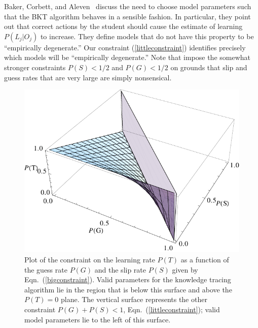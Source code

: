 \documentclass{acmlarge-edm}
\begin{document}
Baker, Corbett, and Aleven~\citeyear{baker_more_2008} discuss the need
to choose model parameters such that the BKT algorithm behaves in a sensible
fashion.  In particular, they point out that correct actions by
the student should cause the estimate of learning
$P(L_j|O_j)$ to increase.  They define models that do not have
this property to be ``empirically degenerate.''   Our constraint
(\ref{littleconstraint}) identifies precisely which models will be ``empirically
degenerate.''  Note that \cite{baker_more_2008} impose the somewhat
stronger constraints $P(S)<1/2$ and $P(G)<1/2$ on grounds that slip and
guess rates that are very large are simply nonsensical.


\begin{figure}
\centering\includegraphics{region}
\caption{
  Plot of the constraint on the learning rate $P(T)$ as a function of the  guess rate $P(G)$ and the
  slip rate $P(S)$ given by Eqn.~(\ref{bigconstraint}).  Valid
  parameters for the knowledge tracing algorithm lie in the region 
  that is below this surface and above the $P(T)=0$ plane.  The
  vertical surface represents the other constraint $ P(G)+P(S)< 1 $,
  Eqn.~(\ref{littleconstraint}); valid model parameters lie to the left of this surface.
}
 \label{region}
\end{figure}
\end{document}

